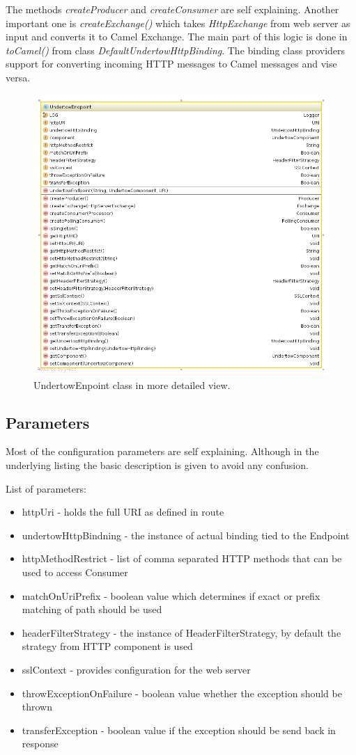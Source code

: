 \documentclass[12pt,final,oneside]{fithesis2}
\begin{document}
The methods \textit{createProducer{}} and \textit{createConsumer{}} are self explaining. Another important one is \textit{createExchange()} which takes \textit{HttpExchange} from web server as input and converts it to Camel Exchange.  The main part of this logic is done in \textit{toCamel()} from class \textit{DefaultUndertowHttpBinding}. The binding class providers support for converting incoming HTTP messages to Camel messages and vise versa.

\begin{figure}[!h]
\centering
\includegraphics[width=0.7\linewidth]{images/undertowEndpoint.png}
\caption{UndertowEnpoint class in more detailed view.}
\end{figure}

\subsection{Parameters}
Most of the configuration parameters are self explaining. Although in the underlying listing the basic description is given to avoid any confusion.

List of parameters:
\begin{itemize}
\item httpUri - holds the full URI as defined in route
\item undertowHttpBindning - the instance of actual binding tied to the Endpoint
\item httpMethodRestrict - list of comma separated HTTP methods that can be used to access Consumer
\item matchOnUriPrefix - boolean value which determines if exact or prefix matching of path should be used 
\item headerFilterStrategy - the instance of HeaderFilterStrategy, by default the strategy from HTTP component is used
\item sslContext - provides configuration for the web server
\item throwExceptionOnFailure - boolean value whether the exception should be thrown
\item transferException - boolean value if the exception should be send back in response 
\end{itemize}
\end{document}
